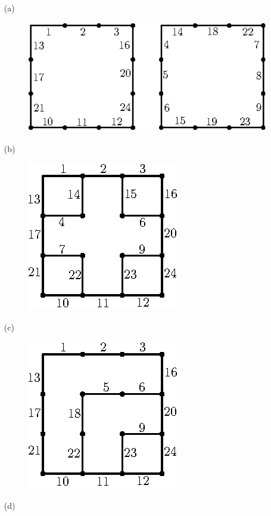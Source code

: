 \begin{enumerate}
\begin{itemize}
\item[(a)] 
\begin{figure}[H]
\centering
\includegraphics{images/chap8/ans13a.eps}
\end{figure}
\item[(b)] 
\begin{figure}[H]
\centering
\includegraphics{images/chap8/ans13b.eps}
\end{figure}
\item[(c)] 
\begin{figure}[H]
\centering
\includegraphics{images/chap8/ans13c.eps}
\end{figure}
\item[(d)] 
\begin{figure}[H]

\end{figure}
\end{itemize}
\end{enumerate}
